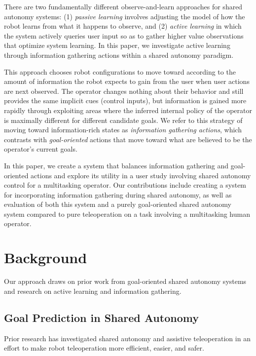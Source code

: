 \documentclass[conference]{IEEEtran}
\begin{document}
There are two fundamentally different observe-and-learn approaches for shared autonomy systems: (1) \textit{passive learning} involves adjusting the model of how the robot learns from what it happens to observe, and (2) \textit{active learning} in which the system actively queries user input so as to gather higher value observations that optimize system learning. In this paper, we investigate active learning through information gathering actions within a shared autonomy paradigm.

This approach chooses robot configurations to move toward according to the amount of information the robot expects to gain from the user when user actions are next observed. The operator changes nothing about their behavior and still provides the same implicit cues (control inputs), but information is gained more rapidly through exploiting areas where the inferred internal policy of the operator is maximally different for different candidate goals. We refer to this strategy of moving toward information-rich states as \textit{information gathering actions}, which contrasts with \textit{goal-oriented} actions that move toward what are believed to be the operator's current goals.

In this paper, we create a system that balances information gathering and goal-oriented actions and explore its utility in a user study involving shared autonomy control for a multitasking operator. Our contributions include creating a system for incorporating information gathering during shared autonomy, as well as evaluation of both this system and a purely goal-oriented shared autonomy system compared to pure teleoperation on a task involving a multitasking human operator.

\section{Background}

Our approach draws on prior work from goal-oriented shared autonomy systems and research on active learning and information gathering.

\subsection{Goal Prediction in Shared Autonomy}

Prior research has investigated shared autonomy and assistive teleoperation in an effort to make robot teleoperation more efficient, easier, and safer.
\end{document}
